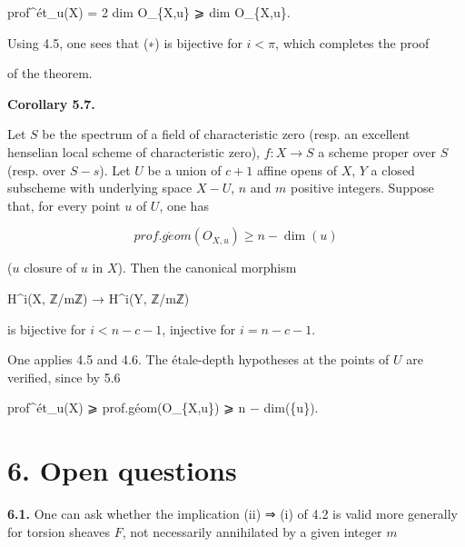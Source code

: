 \documentclass[
  11pt,
  a4paper,
]{book}
\newenvironment{Shaded}{}{}
\newcommand{\NormalTok}[1]{#1}
\begin{document}
\begin{Shaded}
\begin{Highlighting}[]
\NormalTok{prof\^{}ét\_u(X) = 2 dim O\_\{X,u\} ⩾ dim O\_\{X,u\}.}
\end{Highlighting}
\end{Shaded}

Using 4.5, one sees that (∗) is bijective for \(i < \pi\), which
completes the proof

of the theorem.

\textbf{Corollary 5.7.}

Let \(S\) be the spectrum of a field of characteristic zero (resp. an
excellent henselian local scheme of characteristic zero),
\(f : X \to S\) a scheme proper over \(S\) (resp. over \(S - {s}\)). Let
\(U\) be a union of \(c + 1\) affine opens of \(X\), \(Y\) a closed
subscheme with underlying space \(X - U\), \(n\) and \(m\) positive
integers. Suppose that, for every point \(u\) of \(U\), one has

\[ prof.g\acute{e}om(O_{X,u}) \geqslant n - \dim({u}) \]

(\({u}\) closure of \(u\) in \(X\)). Then the canonical morphism

\begin{Shaded}
\begin{Highlighting}[]
\NormalTok{H\^{}i(X, ℤ/mℤ) → H\^{}i(Y, ℤ/mℤ)}
\end{Highlighting}
\end{Shaded}

is bijective for \(i < n - c - 1\), injective for \(i = n - c - 1\).

One applies 4.5 and 4.6. The étale-depth hypotheses at the points of
\(U\) are verified, since by 5.6

\begin{Shaded}
\begin{Highlighting}[]
\NormalTok{prof\^{}ét\_u(X) ⩾ prof.géom(O\_\{X,u\}) ⩾ n − dim(\{u\}).}
\end{Highlighting}
\end{Shaded}

\section{6. Open questions}\label{open-questions}

\textbf{6.1.} One can ask whether the implication (ii) ⇒ (i) of 4.2 is
valid more generally for torsion sheaves \(F\), not necessarily
annihilated by a given integer \(m\)
\end{document}
